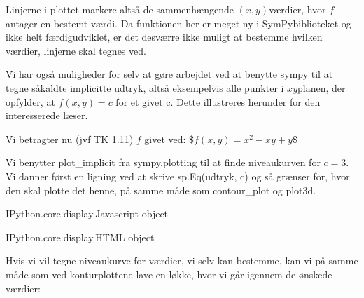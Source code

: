 \documentclass[letterpaper,10pt,english]{jupyterBook}
\begin{document}
Linjerne i plottet markere altså de sammenhængende \((x,y)\)\sphinxhyphen{}værdier, hvor \(f\) antager en bestemt værdi. Da funktionen her er meget ny i SymPy\sphinxhyphen{}biblioteket og ikke helt færdigudviklet, er det desværre ikke muligt at bestemme hvilken værdier, linjerne skal tegnes ved.

Vi har også muligheder for selv at gøre arbejdet ved at benytte sympy til at tegne såkaldte implicitte udtryk, altså eksempelvis alle punkter i \(xy\)\sphinxhyphen{}planen, der opfylder, at \(f(x,y) = c\) for et givet c. Dette illustreres herunder for den interesserede læser.

Vi betragter nu (jvf TK 1.11) \(f\) givet ved:
\$\(f(x,y) = x^2 - xy + y\)\$

Vi benytter plot\_implicit fra sympy.plotting til at finde niveaukurven for \(c = 3\). Vi danner først en ligning ved at skrive sp.Eq(udtryk, c) og så grænser for, hvor den skal plotte det henne, på samme måde som contour\_plot og plot3d.

\begin{sphinxVerbatim}[commandchars=\\\{\}]
          

   
       
\end{sphinxVerbatim}

\begin{sphinxVerbatim}[commandchars=\\\{\}]
\PYGZlt{}IPython.core.display.Javascript object\PYGZgt{}
\end{sphinxVerbatim}

\begin{sphinxVerbatim}[commandchars=\\\{\}]
\PYGZlt{}IPython.core.display.HTML object\PYGZgt{}
\end{sphinxVerbatim}

Hvis vi vil tegne niveaukurve for værdier, vi selv kan bestemme, kan vi på samme måde som ved konturplottene lave en løkke, hvor vi går igennem de ønskede værdier:
\end{document}
